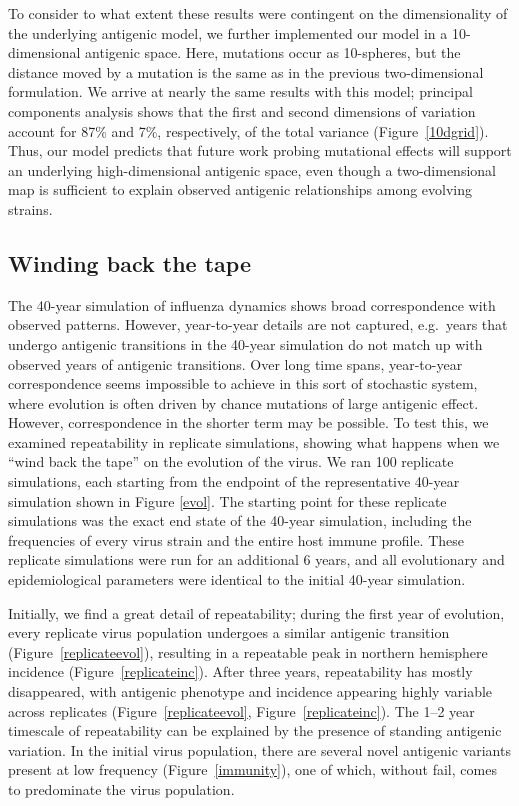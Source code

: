 \documentclass[11pt,oneside,letterpaper]{article}
\begin{document}
To consider to what extent these results were contingent on the dimensionality of the underlying antigenic model, we further implemented our model in a 10-dimensional antigenic space.  Here, mutations occur as 10-spheres, but the distance moved by a mutation is the same as in the previous two-dimensional formulation.  We arrive at nearly the same results with this model; principal components analysis shows that the first and second dimensions of variation account for 87\% and 7\%, respectively, of the total variance (Figure~\ref{10dgrid}).  Thus, our model predicts that future work probing mutational effects will support an underlying high-dimensional antigenic space, even though a two-dimensional map is sufficient to explain observed antigenic relationships among evolving strains.

\subsection*{Winding back the tape}

The 40-year simulation of influenza dynamics shows broad correspondence with observed patterns. However, year-to-year details are not captured, e.g.\ years that undergo antigenic transitions in the 40-year simulation do not match up with observed years of antigenic transitions.  Over long time spans, year-to-year correspondence seems impossible to achieve in this sort of stochastic system, where evolution is often driven by chance mutations of large antigenic effect.  However, correspondence in the shorter term may be possible.  To test this, we examined repeatability in replicate simulations, showing what happens when we ``wind back the tape'' \cite{GouldWonderfulLife} on the evolution of the virus.  We ran 100 replicate simulations, each starting from the endpoint of the representative 40-year simulation shown in Figure \ref{evol}.  The starting point for these replicate simulations was the exact end state of the 40-year simulation, including the frequencies of every virus strain and the entire host immune profile.  These replicate simulations were run for an additional 6 years, and all evolutionary and epidemiological parameters were identical to the initial 40-year simulation.  

Initially, we find a great detail of repeatability; during the first year of evolution, every replicate virus population undergoes a similar antigenic transition (Figure~\ref{replicateevol}), resulting in a repeatable peak in northern hemisphere incidence (Figure~\ref{replicateinc}).  After three years, repeatability has mostly disappeared, with antigenic phenotype and incidence appearing highly variable across replicates (Figure~\ref{replicateevol}, Figure~\ref{replicateinc}).  The 1--2 year timescale of repeatability can be explained by the presence of standing antigenic variation.  In the initial virus population, there are several novel antigenic variants present at low frequency (Figure~\ref{immunity}), one of which, without fail, comes to predominate the virus population.  
\end{document}
